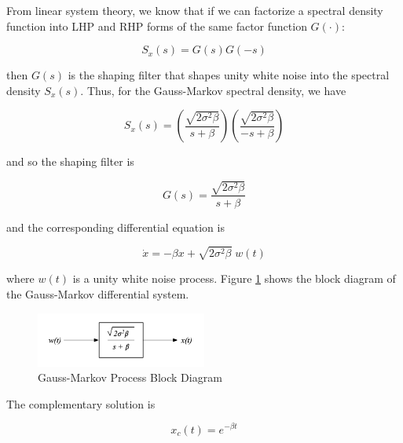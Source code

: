 \documentclass[12pt]{article}
\begin{document}
From linear system theory, we know that if we can factorize a spectral density function
into LHP and RHP forms of the same factor function $G(\cdot)$:

\begin{equation}
    S_x(s) = G(s) G(-s)
    \label{eq:Spectral-factorization}
\end{equation}

then $G(s)$ is the shaping filter that shapes unity white noise into the spectral density
$S_x(s)$. Thus, for the Gauss-Markov spectral density, we have

\begin{equation}
    S_x(s) = \left ( \frac{\sqrt{2 \sigma^2 \beta}}{s + \beta} \right ) \left ( \frac{\sqrt{2 \sigma^2 \beta}}{-s + \beta} \right )
    \label{eq:GM-spectral-factorization}
\end{equation}

and so the shaping filter is

\begin{equation}
    G(s) = \frac{\sqrt{2 \sigma^2 \beta}}{s + \beta}
    \label{eq:GM-shaping-filter}
\end{equation}

and the corresponding differential equation is

\begin{equation}
    \dot{x} = - \beta x + \sqrt{2 \sigma^2 \beta} \; w(t)
    \label{eq:GM-differential-equation}
\end{equation}

where $w(t)$ is a unity white noise process. Figure \ref{fig:GM-block-diagram} shows
the block diagram of the Gauss-Markov differential system.

\begin{figure}[ht]
    \centering
    \includegraphics[width=0.5\textwidth]{GM-Block-Diagram.png}
    \caption{Gauss-Markov Process Block Diagram}
    \label{fig:GM-block-diagram}
\end{figure}

The complementary solution is

\begin{equation}
    x_c(t) = e^{-\beta t}
    \label{eq:GM-complementary-solution}
\end{equation}
\end{document}
